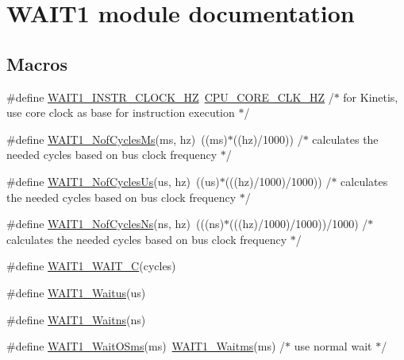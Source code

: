 \hypertarget{group___w_a_i_t1__module}{}\section{W\+A\+I\+T1 module documentation}
\label{group___w_a_i_t1__module}
\subsection*{Macros}
\begin{DoxyCompactItemize}
\item 
\#define \hyperlink{group___w_a_i_t1__module_gad719b8589ad1bf92a03ec94ce95c4804}{W\+A\+I\+T1\+\_\+\+I\+N\+S\+T\+R\+\_\+\+C\+L\+O\+C\+K\+\_\+\+HZ}~\hyperlink{group___cpu__module_ga9dee0abd722c849e54c662ab11a1d2cf}{C\+P\+U\+\_\+\+C\+O\+R\+E\+\_\+\+C\+L\+K\+\_\+\+HZ} /$\ast$ for Kinetis, use core clock as base for instruction execution $\ast$/
\item 
\#define \hyperlink{group___w_a_i_t1__module_ga7e74874c42a8979fb279fc86d373b60a}{W\+A\+I\+T1\+\_\+\+Nof\+Cycles\+Ms}(ms,  hz)~((ms)$\ast$((hz)/1000)) /$\ast$ calculates the needed cycles based on bus clock frequency $\ast$/
\item 
\#define \hyperlink{group___w_a_i_t1__module_ga7dabbdd9744304c62df945607fa13dcf}{W\+A\+I\+T1\+\_\+\+Nof\+Cycles\+Us}(us,  hz)~((us)$\ast$(((hz)/1000)/1000)) /$\ast$ calculates the needed cycles based on bus clock frequency $\ast$/
\item 
\#define \hyperlink{group___w_a_i_t1__module_gaca73593e1131b4845062bd9ec4ee5cac}{W\+A\+I\+T1\+\_\+\+Nof\+Cycles\+Ns}(ns,  hz)~(((ns)$\ast$(((hz)/1000)/1000))/1000) /$\ast$ calculates the needed cycles based on bus clock frequency $\ast$/
\item 
\#define \hyperlink{group___w_a_i_t1__module_ga9824395bc44b736ec5b29dd219ef8418}{W\+A\+I\+T1\+\_\+\+W\+A\+I\+T\+\_\+C}(cycles)
\item 
\#define \hyperlink{group___w_a_i_t1__module_ga3bad7338e555cbbbaa870ee3fe2db0f6}{W\+A\+I\+T1\+\_\+\+Waitus}(us)
\item 
\#define \hyperlink{group___w_a_i_t1__module_ga69b0cc93f0910d7f8f238d3e7d43c2c3}{W\+A\+I\+T1\+\_\+\+Waitns}(ns)
\item 
\#define \hyperlink{group___w_a_i_t1__module_ga2691150b572fe622d361fb48539af70e}{W\+A\+I\+T1\+\_\+\+Wait\+O\+Sms}(ms)~\hyperlink{group___w_a_i_t1__module_ga04b03075f856862ff2bc4ff69825aeb6}{W\+A\+I\+T1\+\_\+\+Waitms}(ms) /$\ast$ use normal wait $\ast$/
\end{DoxyCompactItemize}
